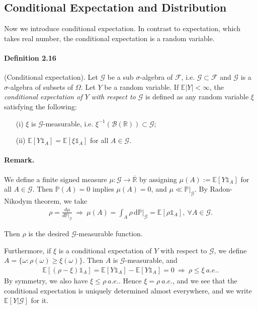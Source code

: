 \documentclass{article}
\numberwithin{equation}{section}
\newcommand{\E}{\mathbb{E}}
\renewcommand{\P}{\mathbb{P}}
\renewcommand{\d}{\mathrm{d}}
\theoremstyle{plain}
\theoremstyle{definition}
\begin{document}
\subsection{Conditional Expectation and Distribution}
Now we introduce conditional expectation. In contrast to expectation, which takes real number, the conditional expectation is a random variable.
\paragraph{Definition 2.16\label{def:2.16}} (Conditional expectation). Let $\mathscr{G}$ be a sub $\sigma$-algebra of $\mathscr{F}$, i.e. $\mathscr{G}\subset\mathscr{F}$ and $\mathscr{G}$ is a $\sigma$-algebra of subsets of $\Omega$. Let $Y$ be a random variable. If $\E\vert Y\vert<\infty$, the \textit{conditional expectation of $Y$ with respect to $\mathscr{G}$} is defined as any random variable $\xi$ satisfying the following:
\begin{itemize}
	\item[(i)] $\xi$ is $\mathscr{G}$-measurable, i.e. $\xi^{-1}\left(\mathscr{B}(\mathbb{R})\right)\subset\mathscr{G}$;
	\item[(ii)] $\E[Y\mathds{1}_A]=\E[\xi\mathds{1}_A]$ for all $A\in\mathscr{G}$.
\end{itemize}
\paragraph{Remark.} We define a finite signed measure $\mu:\mathscr{G}\to\overline{\mathbb{R}}$ by assigning $\mu(A) := \E[Y\mathds{1}_A]$ for all $A\in\mathscr{G}$. 
Then $\P(A)=0$ implies $\mu(A)=0$, and $\mu\ll\P|_\mathscr{G}$. By Radon-Nikodym theorem, we take 
\begin{align*}
	\rho=\frac{d\mu}{d\P|_\mathscr{G}}\ \Rightarrow\ \mu(A)=\int_A\rho\,\d \P|_\mathscr{G}=\E[\rho\mathds{1}_A],\ \forall A\in\mathscr{G}.
\end{align*}

Then $\rho$ is the desired $\mathscr{G}$-measurable function.

Furthermore, if $\xi$ is a conditional expectation of $Y$ with respect to $\mathscr{G}$, we define $A=\{\omega:\rho(\omega)\geq\xi(\omega)\}$. Then $A$ is $\mathscr{G}$-measurable, and
\begin{align*}
	\E[(\rho-\xi)\mathds{1}_A]=\E[Y\mathds{1}_A]-\E[Y\mathds{1}_A] = 0\ \Rightarrow\ \rho\leq\xi\ a.e..
\end{align*}
By symmetry, we also have $\xi\leq\rho\ a.e.$. Hence $\xi=\rho\ a.e.$, and we see that the conditional expectation is uniquely determined almost everywhere, and we write $\E[Y|\mathscr{G}]$ for it.
\end{document}
